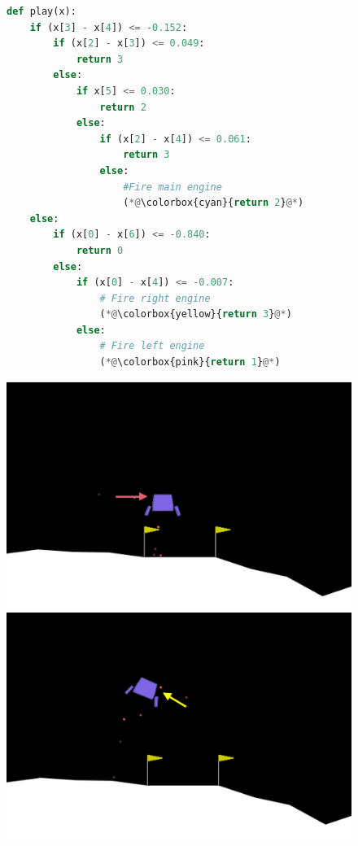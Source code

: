 \begin{figure}
\centering
\begin{minipage}{0.545\textwidth}
\begin{tcolorbox}
\begin{lstlisting}[language=Python]
def play(x):
    if (x[3] - x[4]) <= -0.152:
        if (x[2] - x[3]) <= 0.049:
            return 3
        else:
            if x[5] <= 0.030:
                return 2
            else:
                if (x[2] - x[4]) <= 0.061:
                    return 3
                else:
                    #Fire main engine
                    (*@\colorbox{cyan}{return 2}@*)
    else:
        if (x[0] - x[6]) <= -0.840:
            return 0
        else:
            if (x[0] - x[4]) <= -0.007:
                # Fire right engine
                (*@\colorbox{yellow}{return 3}@*)
            else:
                # Fire left engine
                (*@\colorbox{pink}{return 1}@*)
\end{lstlisting}
\end{tcolorbox}
\end{minipage}
\hfill
\begin{minipage}{0.43\textwidth}
    \includegraphics[trim={0 0 0 0},clip,scale=0.24]{images/images_part3/ll_d.png}
    \includegraphics[scale=0.24]{images/images_part3/ll_b.png}

\end{minipage}
\end{figure}
